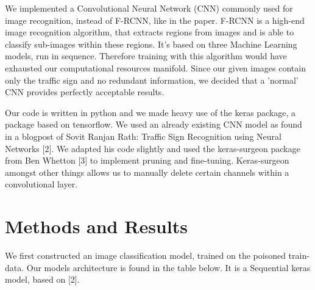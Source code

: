 \documentclass[a4paper,12pt]{article}
\begin{document}
We implemented a Convolutional Neural Network (CNN) commonly used for image recognition, instead of F-RCNN, like in the paper. F-RCNN is a high-end image recognition algorithm, that extracts regions from images and is able to classify sub-images within these regions. It's based on three Machine Learning models, run in sequence. Therefore training with this algorithm would have exhausted our computational resources manifold. Since our given images contain only the traffic sign and no redundant information, we decided that a 'normal' CNN provides perfectly acceptable results.

Our code is written in python and we made heavy use of the keras package, a package based on tensorflow. We used an already existing CNN model as found in a blogpost of Sovit Ranjan Rath: Traffic Sign Recognition using Neural Networks [2]. We adapted his code slightly and used the keras-surgeon package from Ben Whetton [3] to implement pruning and fine-tuning. Keras-surgeon amongst other things allows us to manually delete certain channels within a convolutional layer.




\section{Methods and Results}
We first constructed an image classification model, trained on the poisoned train-data. Our models architecture is found in the table below. It is a Sequential keras model, based on [2].
\end{document}

